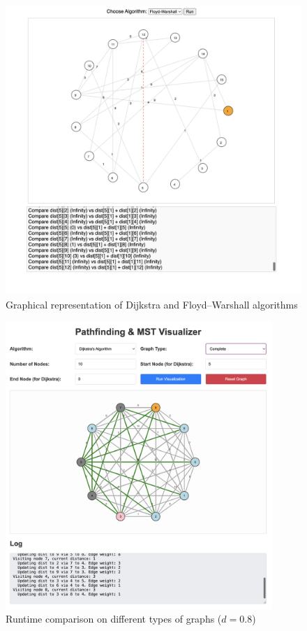 \documentclass[12pt]{article}
\begin{document}
\begin{figure}[h]
    \centering
    \includegraphics[width=1\textwidth]{images/site_warshall.png}
    \caption{Graphical representation of Dijkstra and Floyd–Warshall algorithms}
    \label{fig:sitewarshall}
\end{figure}

\begin{figure}[h]
    \centering
    \includegraphics[width=0.9\textwidth]{images/all.png}
    \caption{Runtime comparison on different types of graphs ($d=0.8$)}
    \label{fig:all}
\end{figure}
\end{document}
